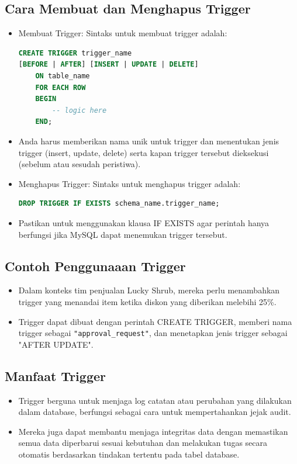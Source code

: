 \documentclass{article}
\begin{document}
\subsection{Cara Membuat dan Menghapus Trigger}
\begin{itemize}
    \item Membuat Trigger: Sintaks untuk membuat trigger adalah:
          \begin{lstlisting}[language=SQL, caption={}, captionpos=b]
CREATE TRIGGER trigger_name
[BEFORE | AFTER] [INSERT | UPDATE | DELETE]
    ON table_name
    FOR EACH ROW
    BEGIN
        -- logic here
    END;
\end{lstlisting}
    \item Anda harus memberikan nama unik untuk trigger dan menentukan jenis trigger (insert, update, delete) serta kapan trigger tersebut dieksekusi (sebelum atau sesudah peristiwa).
    \item Menghapus Trigger: Sintaks untuk menghapus trigger adalah:
          \begin{lstlisting}[language=SQL, caption={}, captionpos=b]
DROP TRIGGER IF EXISTS schema_name.trigger_name;
\end{lstlisting}
    \item Pastikan untuk menggunakan klausa IF EXISTS agar perintah hanya berfungsi jika MySQL dapat menemukan trigger tersebut.
\end{itemize}

\subsection{Contoh Penggunaaan Trigger}
\begin{itemize}
    \item Dalam konteks tim penjualan Lucky Shrub, mereka perlu menambahkan trigger yang menandai item ketika diskon yang diberikan melebihi 25\%.
    \item Trigger dapat dibuat dengan perintah CREATE TRIGGER, memberi nama trigger sebagai \verb|"approval_request"|, dan menetapkan jenis trigger sebagai "AFTER UPDATE".
\end{itemize}

\subsection{Manfaat Trigger}
\begin{itemize}
    \item Trigger berguna untuk menjaga log catatan atau perubahan yang dilakukan dalam database, berfungsi sebagai cara untuk mempertahankan jejak audit.
    \item Mereka juga dapat membantu menjaga integritas data dengan memastikan semua data diperbarui sesuai kebutuhan dan melakukan tugas secara otomatis berdasarkan tindakan tertentu pada tabel database.
\end{itemize}
\end{document}
